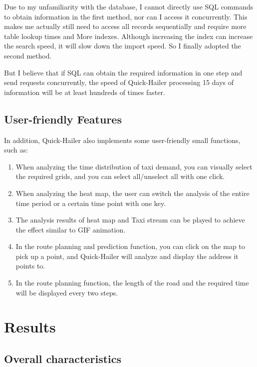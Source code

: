 \documentclass{article}
\begin{document}
Due to my unfamiliarity with the database, I cannot directly use SQL commands to obtain information in the first method, nor can I access it concurrently. This makes me actually still need to access all records sequentially and require more table lookup times and More indexes. Although increasing the index can increase the search speed, it will slow down the import speed. So I finally adopted the second method.

But I believe that if SQL can obtain the required information in one step and send requests concurrently, the speed of Quick-Hailer processing 15 days of information will be at least hundreds of times faster.
\subsection{User-friendly Features}
In addition, Quick-Hailer also implements some user-friendly small functions, such as:
\begin{enumerate}
	\item When analyzing the time distribution of taxi demand, you can visually select the required grids, and you can select all/unselect all with one click.
	\item When analyzing the heat map, the user can switch the analysis of the entire time period or a certain time point with one key.
	\item The analysis results of heat map and Taxi stream can be played to achieve the effect similar to GIF animation.
	\item In the route planning and prediction function, you can click on the map to pick up a point, and Quick-Hailer will analyze and display the address it points to.
	\item In the route planning function, the length of the road and the required time will be displayed every two steps.
\end{enumerate}
\section{Results}
\subsection{Overall characteristics}
\end{document}
